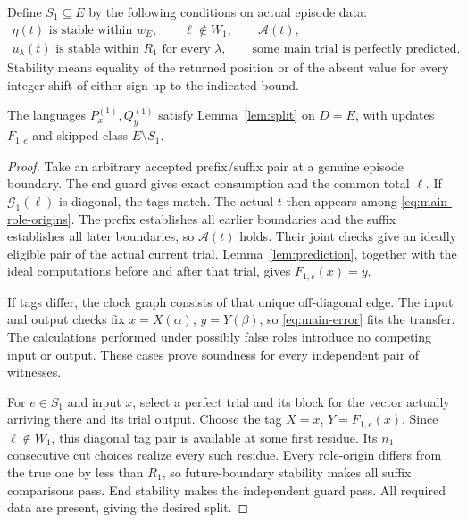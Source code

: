Define \(S_1\subseteq E\) by the following conditions on actual episode data:
\begin{equation}\label{eq:S1}
\begin{gathered}
 \eta(t)\text{ is stable within }w_E,\qquad
 \ell\notin W_1,\qquad \mathcal A(t),\\
 u_\lambda(t)\text{ is stable within }R_1\text{ for every }\lambda,\qquad
 \text{some main trial is perfectly predicted}.
\end{gathered}
\end{equation}
Stability means equality of the returned position or of the absent value for
every integer shift of either sign up to the indicated bound.

\begin{lemma}\label{lem:main-split}
The languages \(P_x^{(1)},Q_y^{(1)}\) satisfy
Lemma~\ref{lem:split} on \(D=E\), with updates \(F_{1,e}\) and skipped class
\(E\setminus S_1\).
\end{lemma}

\begin{proof}
Take an arbitrary accepted prefix/suffix pair at a genuine episode boundary.
The end guard gives exact consumption and the common total \(\ell\).
If \(\mathcal G_1(\ell)\) is diagonal, the tags match. The actual \(t\)
then appears among \eqref{eq:main-role-origins}. The prefix establishes all
earlier boundaries and the suffix establishes all later boundaries, so
\(\mathcal A(t)\) holds. Their joint checks give an ideally eligible pair of
the actual current trial. Lemma~\ref{lem:prediction}, together with the ideal
computations before and after that trial, gives \(F_{1,e}(x)=y\).

If tags differ, the clock graph consists of that unique off-diagonal edge.
The input and output checks fix \(x=X(\alpha)\), \(y=Y(\beta)\), so
\eqref{eq:main-error} fits the transfer. The calculations performed under
possibly false roles introduce no competing input or output. These cases prove
soundness for every independent pair of witnesses.

For \(e\in S_1\) and input \(x\), select a perfect trial and its block for the
vector actually arriving there and its trial output. Choose the tag
\(X=x\), \(Y=F_{1,e}(x)\). Since \(\ell\notin W_1\), this diagonal tag pair
is available at some first residue. Its \(n_1\) consecutive cut choices realize
every such residue. Every role-origin differs from the true one by less than
\(R_1\), so future-boundary stability makes all suffix comparisons pass.
End stability makes the independent guard pass. All required data are present,
giving the desired split.
\end{proof}

